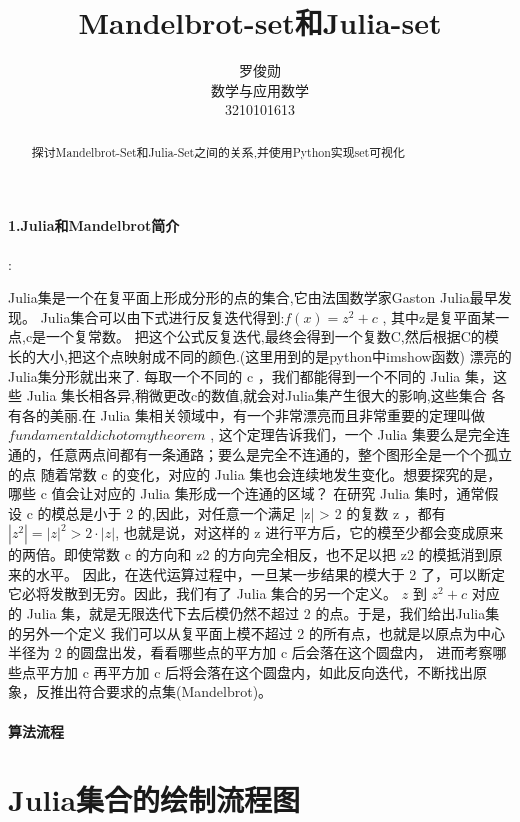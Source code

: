 \documentclass{article}
\title{Mandelbrot-set和Julia-set}
\author{罗俊勋\\数学与应用数学\\3210101613}
\begin{document}
\maketitle
    \begin{abstract}
        探讨Mandelbrot-Set和Julia-Set之间的关系,并使用Python实现set可视化
    \end{abstract}

    \paragraph{1.Julia和Mandelbrot简介}:\par
    Julia集是一个在复平面上形成分形的点的集合,它由法国数学家Gaston Julia最早发现。\cite{first}
    Julia集合可以由下式进行反复迭代得到:$f(x) = z^2 + c$
    , 其中z是复平面某一点,c是一个复常数。
    把这个公式反复迭代,最终会得到一个复数C,然后根据C的模长的大小,把这个点映射成不同的颜色.(这里用到的是python中imshow函数)
    漂亮的Julia集分形就出来了.
    每取一个不同的 c ，我们都能得到一个不同的 Julia 集，这些 Julia 集长相各异,稍微更改c的数值,就会对Julia集产生很大的影响,这些集合
    各有各的美丽.在 Julia 集相关领域中，有一个非常漂亮而且非常重要的定理叫做 $fundamental dichotomy theorem$ ,
    这个定理告诉我们，一个 Julia 集要么是完全连通的，任意两点间都有一条通路；要么是完全不连通的，整个图形全是一个个孤立的点
    随着常数 c 的变化，对应的 Julia 集也会连续地发生变化。想要探究的是，哪些 c 值会让对应的 Julia 集形成一个连通的区域？
    在研究 Julia 集时，通常假设 c 的模总是小于 2 的,因此，对任意一个满足 |z| > 2 的复数 z ，都有 $|z^2| = {|z|}^2 > 2·|z| $,
    也就是说，对这样的 z 进行平方后，它的模至少都会变成原来的两倍。即使常数 c 的方向和 z2 的方向完全相反，也不足以把 z2 的模抵消到原来的水平。
    因此，在迭代运算过程中，一旦某一步结果的模大于 2 了，可以断定它必将发散到无穷。因此，我们有了 Julia 集合的另一个定义。
     $z$ 到 $z^2 + c$ 对应的 Julia 集，就是无限迭代下去后模仍然不超过 2 的点。于是，我们给出Julia集的另外一个定义
     我们可以从复平面上模不超过 2 的所有点，也就是以原点为中心半径为 2 的圆盘出发，看看哪些点的平方加 c 后会落在这个圆盘内，
     进而考察哪些点平方加 c 再平方加 c 后将会落在这个圆盘内，如此反向迭代，不断找出原象，反推出符合要求的点集(Mandelbrot)。
     \cite{second}



     \paragraph{算法流程}
     \section{Julia集合的绘制流程图}
\end{document}
